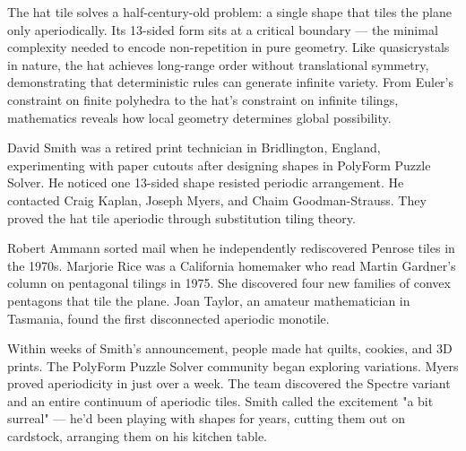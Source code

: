The hat tile solves a half-century-old problem: a single shape that tiles the plane only aperiodically. Its 13-sided form sits at a critical boundary — the minimal complexity needed to encode non-repetition in pure geometry. Like quasicrystals in nature, the hat achieves long-range order without translational symmetry, demonstrating that deterministic rules can generate infinite variety. From Euler's constraint on finite polyhedra to the hat's constraint on infinite tilings, mathematics reveals how local geometry determines global possibility.

\begin{commentary}
David Smith was a retired print technician in Bridlington, England, experimenting with paper cutouts after designing shapes in PolyForm Puzzle Solver. He noticed one 13-sided shape resisted periodic arrangement. He contacted Craig Kaplan, Joseph Myers, and Chaim Goodman-Strauss. They proved the hat tile aperiodic through substitution tiling theory.

Robert Ammann sorted mail when he independently rediscovered Penrose tiles in the 1970s. Marjorie Rice was a California homemaker who read Martin Gardner's column on pentagonal tilings in 1975. She discovered four new families of convex pentagons that tile the plane. Joan Taylor, an amateur mathematician in Tasmania, found the first disconnected aperiodic monotile.

Within weeks of Smith's announcement, people made hat quilts, cookies, and 3D prints. The PolyForm Puzzle Solver community began exploring variations. Myers proved aperiodicity in just over a week. The team discovered the Spectre variant and an entire continuum of aperiodic tiles. Smith called the excitement "a bit surreal" — he'd been playing with shapes for years, cutting them out on cardstock, arranging them on his kitchen table. 

\end{commentary}

\newpage

